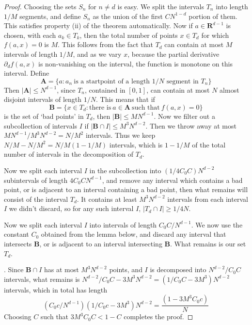 \documentclass{report}
\theoremstyle{plain}
\theoremstyle{plain}
\begin{document}
\begin{proof}
    Choosing the sets $S_n$ for $n \neq d$ is easy. We split the intervals $T_n$ into length $1/M$ segments, and define $S_n$ as the union of the first $CN^{1-d}$ portion of them. This satisfies property (ii) of the theorem automatically. Now if $a \in \mathbf{R}^{d-1}$ is chosen, with each $a_k \in T_k$, then the total number of points $x \in T_d$ for which $f(a,x) = 0$ is $M$. This follows from the fact that $T_d$ can contain at most $M$ intervals of length $1/M$, and as we vary $x$, because the partial derivative $\partial_d f(a,x)$ is non-vanishing on the interval, the function is monotone on this interval. Define
    \[ \mathbf{A} = \{ a: a_n\ \text{is a startpoint of a length $1/N$ segment in $T_n$} \} \]
    Then $|\mathbf{A}| \leq N^{d-1}$, since $T_n$, contained in $[0,1]$, can contain at most $N$ almost disjoint intervals of length $1/N$. This means that if
    \[ \mathbf{B} = \{ x \in T_d: \text{there is}\ a \in \mathbf{A}\ \text{such that}\ f(a,x) = 0 \} \]
    is the set of `bad points' in $T_d$, then $|\mathbf{B}| \leq MN^{d-1}$. Now we filter out a subcollection of intervals $I$ if $|\mathbf{B} \cap I| \leq M^3N^{d-2}$. Then we throw away at most $MN^{d-1}/M^3N^{d-2} = N/M^2$ intervals. Thus we keep $N/M - N/M^2 = N/M(1 - 1/M)$ intervals, which is $1 - 1/M$ of the total number of intervals in the decomposition of $T_d$.

    Now we split each interval $I$ in the subcollection into $(1/4C_0C) N^{d-2}$ subintervals of length $4C_0 C N^{d-1}$, and remove any interval which contains a bad point, or is adjacent to an interval containing a bad point, then what remains will consist of the  interval $T_d$. It contains at least $M^3 N^{d-2}$ intervals from each interval $I$ we didn't discard, so for any such interval $I$, $|T_d \cap I| \geq 1/4N$.

    Now we split each interval $I$ into intervals of length $C_0C / N^{d-1}$. We now use the constant $C_0$ obtained from the lemma below, and discard any interval that intersects $\mathbf{B}$, or is adjacent to an interval intersecting $\mathbf{B}$. What remains is our set $T_d$.

     . Since $\mathbf{B} \cap I$ has at most $M^3N^{d-2}$ points, and $I$ is decomposed into $N^{d-2}/C_0C$ intervals, what remains is $N^{d-2}/C_0C - 3M^3N^{d-2} = (1/C_0C - 3M^3)N^{d-2}$ intervals, which in total has length
    \[ (C_0c/N^{d-1}) (1/C_0c - 3M^3)N^{d-2} = \frac{(1 - 3M^3 C_0c)}{N} \]
    Choosing $C$ such that $3M^3C_0C < 1 - C$ completes the proof.
\end{proof}
\end{document}
